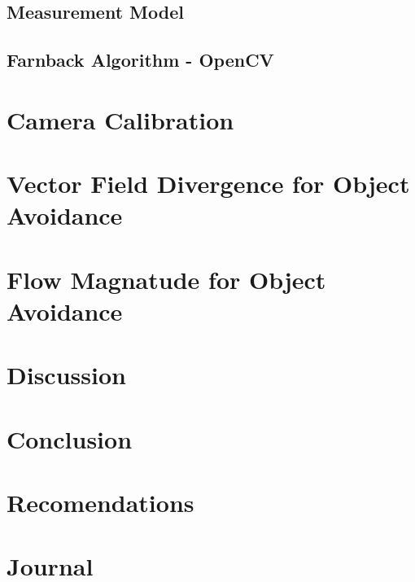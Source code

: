 \documentclass{UoNMCHA}
\numberwithin{equation}{section}
\begin{document}
\subsection{Measurement Model}
\subsection{Farnback Algorithm - OpenCV}

\newpage
\section{Camera Calibration}

\newpage
\section{Vector Field Divergence for Object Avoidance}

\newpage
\section{Flow Magnatude for Object Avoidance}

\newpage
\section{Discussion}

\newpage
\section{Conclusion}\label{sec:Conclusion}

\newpage
\section{Recomendations}

\newpage


\appendix
\newpage
\section{Journal}\label{app:Journal}
\end{document}
